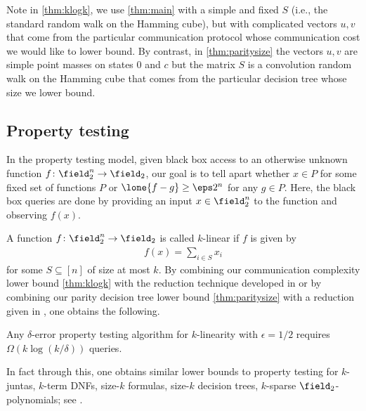 Note in \autoref{thm:klogk}, we use \autoref{thm:main} with a 
simple and fixed $S$ 
(i.e., the standard random walk on the Hamming cube), 
but with complicated vectors $u,v$ that come from the particular 
communication protocol whose communication cost we would like 
to lower bound. By contrast, in \autoref{thm:paritysize} the 
vectors $u,v$ are simple point masses on states $0$ and $c$ but 
the matrix $S$ is a convolution random walk on the Hamming cube 
that comes from the particular decision tree whose size we lower 
bound.

\subsection{Property testing}
\label{sec:proptest}
In the property testing model, given black box access to 
an otherwise unknown function $f\colon\field^n_2\to\field_2$, 
our goal is to tell apart whether $x\in P$ for some fixed set 
of functions $P$ or $\lone{f-g}\ge \eps2^n$ for any $g\in P$. 
Here, the black box queries are done by providing an input 
$x\in\field_2^n$ to the function and observing $f(x)$.

A function $f\colon\field_2^n\to\field_2$ is
called $k$-linear if $f$ is given by
\begin{align*}
f(x) = \sum_{i\in S}x_i
\end{align*} 
for some $S\subseteq[n]$ of size at most $k$.
By combining our communication complexity lower bound 
\autoref{thm:klogk} with the reduction technique developed 
in \cite{BlaisBM2012} or by combining
our parity decision tree lower bound \autoref{thm:paritysize} 
with a reduction given in \cite{BhrushundiCK2014}, one obtains 
the following.

\begingroup
\def\thecorollary{\ref{cor:propertytest}}
\begin{corollary}[restated]
Any $\delta$-error property testing algorithm for 
$k$-linearity with $\epsilon=1/2$ requires 
$\Omega(k\log (k/\delta))$ queries.
\end{corollary}
\addtocounter{theorem}{-1}
\endgroup
In fact through this, one obtains similar lower bounds to
property testing for $k$-juntas, $k$-term DNFs, size-$k$ formulas,
size-$k$ decision trees, $k$-sparse $\field_2$-polynomials;
see \cite{Blais2009, ChakrabortyGM2011}.
